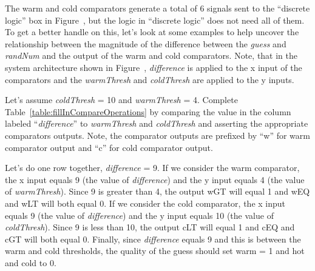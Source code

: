 The warm and cold comparators generate a total of 6 signals sent to the
``discrete logic'' box in Figure~, but the logic in ``discrete logic''
does not need all of them. To get a better handle on this, let's look at
some examples to help uncover the relationship between the magnitude of
the difference between the \emph{guess} and \emph{randNum} and the
output of the warm and cold comparators. Note, that in the system
architecture shown in Figure~, \emph{difference} is applied to the x
input of the comparators and the \emph{warmThresh} and \emph{coldThresh}
are applied to the y inputs.

Let's assume \emph{coldThresh} = 10 and \emph{warmThresh} = 4. Complete
Table~\ref{table:fillInCompareOperations} by comparing the value in the column labeled
``\emph{difference}'' to \emph{warmThresh} and \emph{coldThresh} and
asserting the appropriate comparators outputs. Note, the comparator
outputs are prefixed by ``w'' for warm comparator output and ``c'' for
cold comparator output.

Let's do one row together, \emph{difference} = 9. If we consider the
warm comparator, the x input equals 9 (the value of \emph{difference})
and the y input equals 4 (the value of \emph{warmThresh}). Since 9 is
greater than 4, the output wGT will equal 1 and wEQ and wLT will both
equal 0. If we consider the cold comparator, the x input equals 9 (the
value of \emph{difference}) and the y input equals 10 (the value of
\emph{coldThresh}). Since 9 is less than 10, the output cLT will equal 1
and cEQ and cGT will both equal 0. Finally, since \emph{difference}
equals 9 and this is between the warm and cold thresholds, the quality
of the guess should set warm = 1 and hot and cold to 0.

